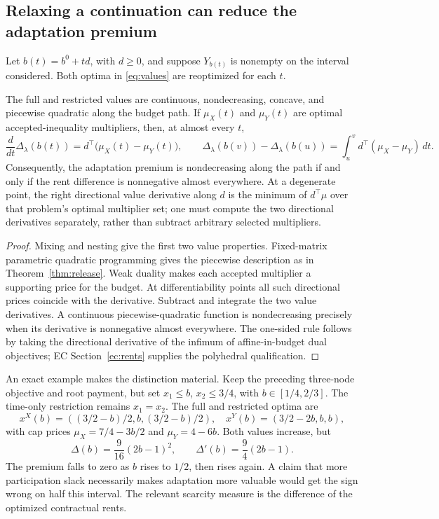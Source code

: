 \subsection{Relaxing a continuation can reduce the adaptation premium}
Let $b(t)=b^0+td$, with $d\geq0$, and suppose $Y_{b(t)}$ is nonempty on the interval considered. Both optima in \eqref{eq:values} are reoptimized for each $t$.
\begin{theorem}\label{thm:rents}
The full and restricted values are continuous, nondecreasing, concave, and piecewise quadratic along the budget path. If $\mu_X(t)$ and $\mu_Y(t)$ are optimal accepted-inequality multipliers, then, at almost every $t$,
\begin{equation}\label{eq:rent-difference}
 \frac{d}{dt}\Delta_\lambda(b(t))
 =d^\top\bigl(\mu_X(t)-\mu_Y(t)\bigr),\qquad
 \Delta_\lambda(b(v))-\Delta_\lambda(b(u))
 =\int_u^v d^\top(\mu_X-\mu_Y)\,dt.
\end{equation}
Consequently, the adaptation premium is nondecreasing along the path if and only if the rent difference is nonnegative almost everywhere. At a degenerate point, the right directional value derivative along $d$ is the minimum of $d^\top\mu$ over that problem's optimal multiplier set; one must compute the two directional derivatives separately, rather than subtract arbitrary selected multipliers.
\end{theorem}
\begin{proof}
Mixing and nesting give the first two value properties. Fixed-matrix parametric quadratic programming gives the piecewise description as in Theorem~\ref{thm:release}. Weak duality makes each accepted multiplier a supporting price for the budget. At differentiability points all such directional prices coincide with the derivative. Subtract and integrate the two value derivatives. A continuous piecewise-quadratic function is nondecreasing precisely when its derivative is nonnegative almost everywhere. The one-sided rule follows by taking the directional derivative of the infimum of affine-in-budget dual objectives; EC Section~\ref{ec:rents} supplies the polyhedral qualification.\end{proof}

An exact example makes the distinction material. Keep the preceding three-node objective and root payment, but set $x_1\leq b$, $x_2\leq3/4$, with $b\in[1/4,2/3]$. The time-only restriction remains $x_1=x_2$. The full and restricted optima are
\[
 x^X(b)=((3/2-b)/2,b,(3/2-b)/2),\quad
 x^Y(b)=(3/2-2b,b,b),
\]
with cap prices $\mu_X=7/4-3b/2$ and $\mu_Y=4-6b$. Both values increase, but
\begin{equation}\label{eq:u-shape}
 \Delta(b)=\frac9{16}(2b-1)^2,\qquad
 \Delta'(b)=\frac94(2b-1).
\end{equation}
The premium falls to zero as $b$ rises to $1/2$, then rises again. A claim that more participation slack necessarily makes adaptation more valuable would get the sign wrong on half this interval. The relevant scarcity measure is the difference of the optimized contractual rents.

